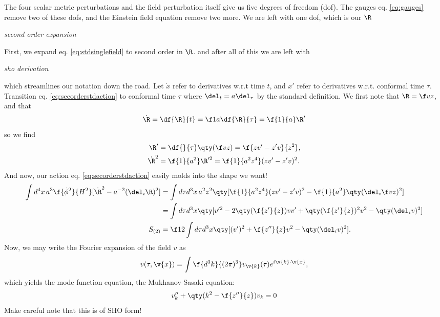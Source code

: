 
The four scalar metric perturbations and the field perturbation itself give us five degrees of freedom (dof). The gauges eq. \eqref{eq:gauges} remove two of these dofs, and the Einstein field equation remove two more. We are left with one dof, which is our $\R $


\textit{second order expansion}


First, we expand eq. \eqref{eq:stdsinglefield} to second order in $\R $. 
and after all of this we are left with  


\textit{sho derivation}

which streamlines our notation down the road. Let $\dot{x}$ refer to derivatives w.r.t time $t$, and $x'$ refer to derivatives w.r.t. conformal time $\tau$.
Transition eq. \eqref{eq:secorderstdaction} to conformal time $\tau$ where $\del_t=a\del_\tau$ by the standard definition. We first note that $\R =\f vz$, and that 
\begin{equation}
    \dot{\R }=\df{\R }{t}=\f1a\df{\R }{\tau}=\f{1}{a}\R '
\end{equation}
so we find
\begin{align}
    \R '&=\df{}{\tau}\qty(\f vz)=\f{zv'-z'v}{z^2},\\
    \dot{\R }^2&=\f{1}{a^2}\R '^2=\f{1}{a^2z^4}(zv'-z'v)^2.
\end{align}
And now, our action eq. \eqref{eq:secorderstdaction} easily molds into the shape we want! 
\begin{align}
    \int d^4x\, a^3 \f{\dot \phi^2}{H^2}[\dot{\R }^2-a^{-2}(\del_i \R )^2]&=\int d\tau d^3x\, a^2z^2\qty[\f{1}{a^2z^4}(zv'-z'v)^2-\f{1}{a^{2}}\qty(\del_i \f vz)^2] \nonumber \\
    &=\int d\tau d^3x\qty[v'^2-2\qty(\f{z'}{z})vv'+\qty(\f{z'}{z})^2v^2-\qty(\del_i v)^2] \nonumber \\
    S_{(2)}&=\f12 \int d\tau d^3x\qty[(v')^2+\f{z''}{z}v^2-\qty(\del_i v)^2].
\end{align}
Now, we may write the Fourier expansion of the field $v$ as
\begin{equation}
    v(\tau,\v{x})=\int \f{d^3k}{(2\pi)^3}v_{\v{k}}(\tau)e^{i\v{k}\cdot\v{x}},
\end{equation}
which yields the mode function equation, the Mukhanov-Sasaki equation:
\begin{equation}
    v''_k+\qty(k^2-\f{z''}{z})v_k=0
\end{equation}
Make careful note that this is of SHO form!

